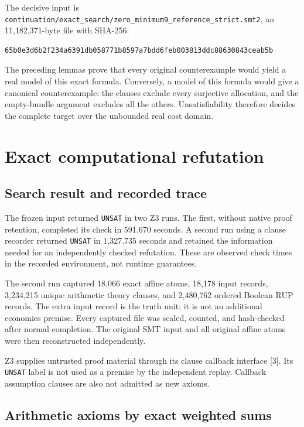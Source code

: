 \documentclass[
  11pt,
]{article}
\begin{document}
The decisive input is
\texttt{continuation/exact\_search/zero\_minimum9\_reference\_strict.smt2},
an 11,182,371-byte file with SHA-256:

\begin{verbatim}
65b0e3d6b2f234a6391db058771b8597a7bdd6feb003813ddc88630843ceab5b
\end{verbatim}

The preceding lemmas prove that every original counterexample would
yield a real model of this exact formula. Conversely, a model of this
formula would give a canonical counterexample: the clauses exclude every
surjective allocation, and the empty-bundle argument excludes all the
others. Unsatisfiability therefore decides the complete target over the
unbounded real cost domain.

\section{Exact computational
refutation}\label{exact-computational-refutation}

\subsection{Search result and recorded
trace}\label{search-result-and-recorded-trace}

The frozen input returned \texttt{UNSAT} in two Z3 runs. The first,
without native proof retention, completed its check in 591.670 seconds.
A second run using a clause recorder returned \texttt{UNSAT} in
1,327.735 seconds and retained the information needed for an
independently checked refutation. These are observed check times in the
recorded environment, not runtime guarantees.

The second run captured 18,066 exact affine atoms, 18,178 input records,
3,234,215 unique arithmetic theory clauses, and 2,480,762 ordered
Boolean RUP records. The extra input record is the truth unit; it is not
an additional economics premise. Every captured file was sealed,
counted, and hash-checked after normal completion. The original SMT
input and all original affine atoms were then reconstructed
independently.

Z3 supplies untrusted proof material through its clause callback
interface {[}3{]}. Its \texttt{UNSAT} label is not used as a premise by
the independent replay. Callback assumption clauses are also not
admitted as new axioms.

\subsection{Arithmetic axioms by exact weighted
sums}\label{arithmetic-axioms-by-exact-weighted-sums}
\end{document}
